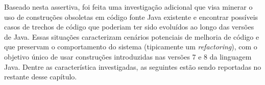 Baseado nesta assertiva, foi feita uma investiga\c c\~{a}o adicional que visa minerar o uso de construções obsoletas 
em c\'{o}digo fonte Java existente e encontrar possíveis casos de trechos de código que poderiam ter sido evoluídos ao longo das versões de Java. 
Essas situa\c c\~{o}es caracterizam cen\'{a}rios potenciais de melhoria de c\'{o}digo e que preservam 
o comportamento do sistema (tipicamente um \textit{refactoring}), com o objetivo \'{u}nico de usar constru\c c\~{o}es introduzidas 
nas vers\~{o}es 7 e 8 da linguagem Java. Dentre as característica investigadas, as 
seguintes est\~{a}o sendo reportadas no restante desse cap\'{i}tulo. 
%
%



%



